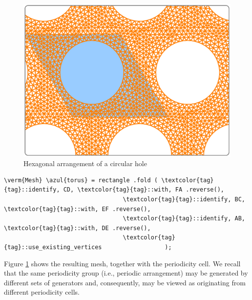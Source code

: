\begin{figure}[ht] \centering
  \includegraphics[width=135mm]{hexa-round-hole.eps}
  \caption{Hexagonal arrangement of a circular hole}
  \label{\numb section 7.\numb fig 13}
\end{figure}

\begin{Verbatim}[commandchars=\\\{\},formatcom=\small\tt,frame=single,
   label=parag-\ref{\numb section 7.\numb parag 18}.cpp,rulecolor=\color{coment},
   baselinestretch=0.94,framesep=2mm                                             ]
   \verm{Mesh} \azul{torus} = rectangle .fold ( \textcolor{tag}{tag}::identify, CD, \textcolor{tag}{tag}::with, FA .reverse(),
                                  \textcolor{tag}{tag}::identify, BC, \textcolor{tag}{tag}::with, EF .reverse(),
                                  \textcolor{tag}{tag}::identify, AB, \textcolor{tag}{tag}::with, DE .reverse(),
                                  \textcolor{tag}{tag}::use_existing_vertices                  );
\end{Verbatim}

Figure \ref{\numb section 7.\numb fig 13} shows the resulting mesh, together with the
periodicity cell.
We recall that the same periodicity group (i.e., periodic arrangement) may be generated
by different sets of generators and, consequently, may be viewed as originating
from different periodicity cells.


